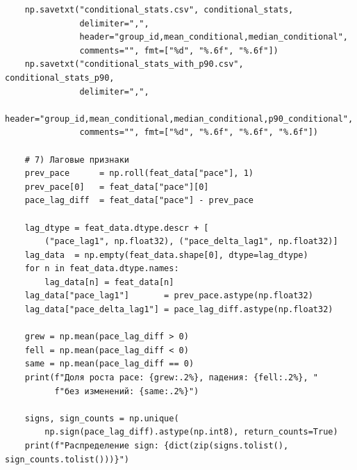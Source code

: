 \documentclass[oneside,a4paper,14pt]{extarticle}
\begin{document}
\begin{verbatim}
    np.savetxt("conditional_stats.csv", conditional_stats,
               delimiter=",",
               header="group_id,mean_conditional,median_conditional",
               comments="", fmt=["%d", "%.6f", "%.6f"])
    np.savetxt("conditional_stats_with_p90.csv", conditional_stats_p90,
               delimiter=",",
               header="group_id,mean_conditional,median_conditional,p90_conditional",
               comments="", fmt=["%d", "%.6f", "%.6f", "%.6f"])

    # 7) Лаговые признаки
    prev_pace      = np.roll(feat_data["pace"], 1)
    prev_pace[0]   = feat_data["pace"][0]
    pace_lag_diff  = feat_data["pace"] - prev_pace

    lag_dtype = feat_data.dtype.descr + [
        ("pace_lag1", np.float32), ("pace_delta_lag1", np.float32)]
    lag_data  = np.empty(feat_data.shape[0], dtype=lag_dtype)
    for n in feat_data.dtype.names:
        lag_data[n] = feat_data[n]
    lag_data["pace_lag1"]       = prev_pace.astype(np.float32)
    lag_data["pace_delta_lag1"] = pace_lag_diff.astype(np.float32)

    grew = np.mean(pace_lag_diff > 0)
    fell = np.mean(pace_lag_diff < 0)
    same = np.mean(pace_lag_diff == 0)
    print(f"Доля роста pace: {grew:.2%}, падения: {fell:.2%}, "
          f"без изменений: {same:.2%}")

    signs, sign_counts = np.unique(
        np.sign(pace_lag_diff).astype(np.int8), return_counts=True)
    print(f"Распределение sign: {dict(zip(signs.tolist(), sign_counts.tolist()))}")
\end{verbatim}
\end{document}
